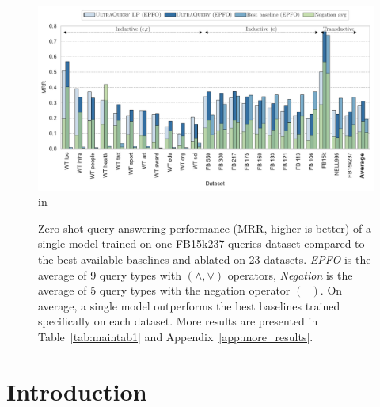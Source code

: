 \vspace{-1em}
\begin{figure}[!htbp]
    \centering
    \includegraphics[width=\linewidth]{figs/mainfig1_MRR_pyg.pdf}
     in
    \caption{Zero-shot query answering performance (MRR, higher is better) of a single \method model trained on one FB15k237 queries dataset compared to the best available baselines and ablated \methodlp on 23 datasets. \emph{EPFO} is the average of 9 query types with $(\wedge, \lor)$ operators, \emph{Negation} is the average of 5 query types with the negation operator $(\neg)$. %
    On average, a single \method model outperforms the best baselines trained specifically on each dataset. More results are presented in Table~\ref{tab:maintab1} and Appendix~\ref{app:more_results}.
    }
    \label{fig:main_fig1}
\end{figure}

\section{Introduction}
\label{sec:intro}

